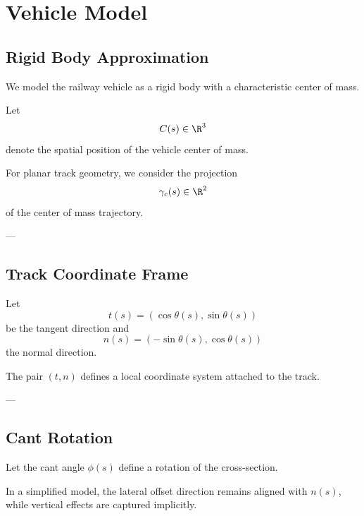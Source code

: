 \section{Vehicle Model}

\subsection{Rigid Body Approximation}

\begin{remark}
We model the railway vehicle as a rigid body with a characteristic
center of mass.
\end{remark}

\begin{definition}
Let
\[
C(s) \in \R^3
\]
denote the spatial position of the vehicle center of mass.
\end{definition}

\begin{remark}
For planar track geometry, we consider the projection
\[
\gamma_c(s) \in \R^2
\]
of the center of mass trajectory.
\end{remark}

---

\subsection{Track Coordinate Frame}

\begin{definition}
Let
\[
t(s) = (\cos\theta(s),\sin\theta(s))
\]
be the tangent direction and
\[
n(s) = (-\sin\theta(s),\cos\theta(s))
\]
the normal direction.
\end{definition}

\begin{remark}
The pair \((t,n)\) defines a local coordinate system attached to the
track.
\end{remark}

---

\subsection{Cant Rotation}

\begin{definition}
Let the cant angle \(\phi(s)\) define a rotation of the cross-section.
\end{definition}

\begin{remark}
In a simplified model, the lateral offset direction remains aligned
with \(n(s)\), while vertical effects are captured implicitly.
\end{remark}

